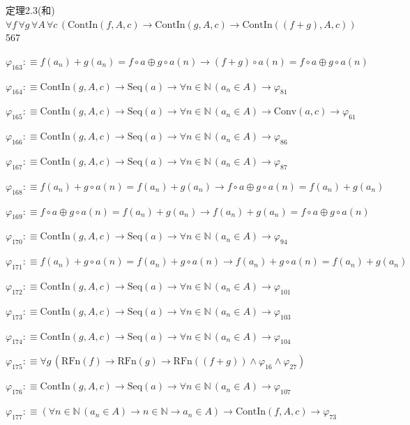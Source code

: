\begin{fullproof}{定理2.3(和)}{$\forall f\,\forall g\,\forall A\,\forall c\,(\mathrm{ContIn}(f,A,c) \to \mathrm{ContIn}(g,A,c) \to \mathrm{ContIn}((f + g),A,c))$}{567}
\begin{abbrevlist}
\item $\varphi_{163} :\equiv f(a_{n}) + g(a_{n}) = f \circ a \oplus g \circ a(n) \to (f + g) \circ a(n) = f \circ a \oplus g \circ a(n)$
\item $\varphi_{164} :\equiv \mathrm{ContIn}(g,A,c) \to \mathrm{Seq}(a) \to \forall n \in \mathbb{N}\,(a_{n} \in A) \to \varphi_{81}$
\item $\varphi_{165} :\equiv \mathrm{ContIn}(g,A,c) \to \mathrm{Seq}(a) \to \forall n \in \mathbb{N}\,(a_{n} \in A) \to \mathrm{Conv}(a,c) \to \varphi_{61}$
\item $\varphi_{166} :\equiv \mathrm{ContIn}(g,A,c) \to \mathrm{Seq}(a) \to \forall n \in \mathbb{N}\,(a_{n} \in A) \to \varphi_{86}$
\item $\varphi_{167} :\equiv \mathrm{ContIn}(g,A,c) \to \mathrm{Seq}(a) \to \forall n \in \mathbb{N}\,(a_{n} \in A) \to \varphi_{87}$
\item $\varphi_{168} :\equiv f(a_{n}) + g \circ a(n) = f(a_{n}) + g(a_{n}) \to f \circ a \oplus g \circ a(n) = f(a_{n}) + g(a_{n})$
\item $\varphi_{169} :\equiv f \circ a \oplus g \circ a(n) = f(a_{n}) + g(a_{n}) \to f(a_{n}) + g(a_{n}) = f \circ a \oplus g \circ a(n)$
\item $\varphi_{170} :\equiv \mathrm{ContIn}(g,A,c) \to \mathrm{Seq}(a) \to \forall n \in \mathbb{N}\,(a_{n} \in A) \to \varphi_{94}$
\item $\varphi_{171} :\equiv f(a_{n}) + g \circ a(n) = f(a_{n}) + g \circ a(n) \to f(a_{n}) + g \circ a(n) = f(a_{n}) + g(a_{n})$
\item $\varphi_{172} :\equiv \mathrm{ContIn}(g,A,c) \to \mathrm{Seq}(a) \to \forall n \in \mathbb{N}\,(a_{n} \in A) \to \varphi_{101}$
\item $\varphi_{173} :\equiv \mathrm{ContIn}(g,A,c) \to \mathrm{Seq}(a) \to \forall n \in \mathbb{N}\,(a_{n} \in A) \to \varphi_{103}$
\item $\varphi_{174} :\equiv \mathrm{ContIn}(g,A,c) \to \mathrm{Seq}(a) \to \forall n \in \mathbb{N}\,(a_{n} \in A) \to \varphi_{104}$
\item $\varphi_{175} :\equiv \forall g\,(\mathrm{RFn}(f) \to \mathrm{RFn}(g) \to \mathrm{RFn}((f + g)) \land \varphi_{16} \land \varphi_{27})$
\item $\varphi_{176} :\equiv \mathrm{ContIn}(g,A,c) \to \mathrm{Seq}(a) \to \forall n \in \mathbb{N}\,(a_{n} \in A) \to \varphi_{107}$
\item $\varphi_{177} :\equiv (\forall n \in \mathbb{N}\,(a_{n} \in A) \to n \in \mathbb{N} \to a_{n} \in A) \to \mathrm{ContIn}(f,A,c) \to \varphi_{73}$

\end{abbrevlist}
\end{fullproof}
